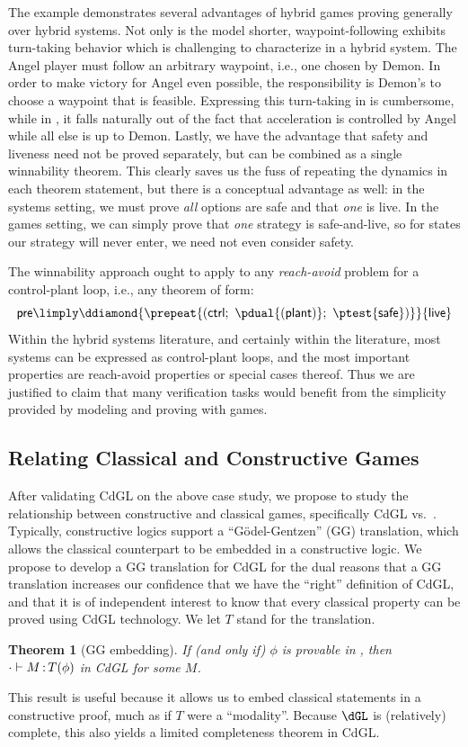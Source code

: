 \documentclass[12pt]{cmuthesis}
\newtheorem{theorem}{Theorem}
\theoremstyle{definition}
\theoremstyle{remark}
\newcommand{\ctrl}{\textsf{ctrl}\xspace}
\newcommand{\plant}{\textsf{plant}\xspace}
\newcommand{\rref}[2][]{\prettyref{#2}}
\newcommand{\CdGL}{\textsf{CdGL}\xspace}
\begin{document}
The example demonstrates several advantages of hybrid games proving generally over hybrid systems.
Not only is the model shorter, waypoint-following exhibits turn-taking behavior which is challenging to characterize in a hybrid system.
The Angel player must follow an arbitrary waypoint, i.e., one chosen by Demon.
In order to make victory for Angel even possible, the responsibility is Demon's to choose a waypoint that is feasible.
Expressing this turn-taking in \rref{thm:liveness} is cumbersome, while in \rref{thm:angel-wins-gen}, it falls naturally out of the fact that acceleration is controlled by Angel while all else is up to Demon.
Lastly, we have the advantage that safety and liveness need not be proved separately, but can be combined as a single winnability theorem.
This clearly saves us the fuss of repeating the dynamics in each theorem statement, but there is a conceptual advantage as well: in the systems setting, we must prove \emph{all} options are safe and that \emph{one} is live.
In the games setting, we can simply prove that \emph{one} strategy is safe-and-live, so for states our strategy will never enter, we need not even consider safety.

The winnability approach ought to apply to any \emph{reach-avoid} problem for a control-plant loop, i.e., any theorem of form:
\[\textsf{pre} \limply \ddiamond{\prepeat{(\ctrl;~\pdual{(\plant)};~\ptest{\textsf{safe}})}}{\textsf{live}}\]
Within the hybrid systems literature, and certainly within the \dL literature, most systems can be expressed as control-plant loops, and the most important properties are reach-avoid properties or special cases thereof.
Thus we are justified to claim that many verification tasks would benefit from the simplicity provided by modeling and proving with games.

\subsection{Relating Classical and Constructive Games}
After validating \CdGL on the above case study, we propose to study the relationship between constructive and classical games, specifically \CdGL vs.\ \dGL.
Typically, constructive logics support a ``G\"{o}del-Gentzen'' (GG) translation, which allows the classical counterpart to be embedded in a constructive logic.
We propose to develop a GG translation for \CdGL for the dual reasons that a GG translation increases our confidence that we have the ``right'' definition of \CdGL, and that it is of independent interest to know that every classical \dGL property can be proved using \CdGL technology.
We let $T$ stand for the translation.
\begin{theorem}[GG embedding]
  If (and only if) $\phi$ is provable in \dGL, then $\cdot\allowbreak\vdash M \allowbreak \mathop{:} T(\phi)$ in \CdGL for some $M$.
\end{theorem}
This result is useful because it allows us to embed classical statements in a constructive proof, much as if $T$ were a ``modality''.
Because $\dGL$ is (relatively) complete, this also yields a limited completeness theorem in \CdGL.
\end{document}
